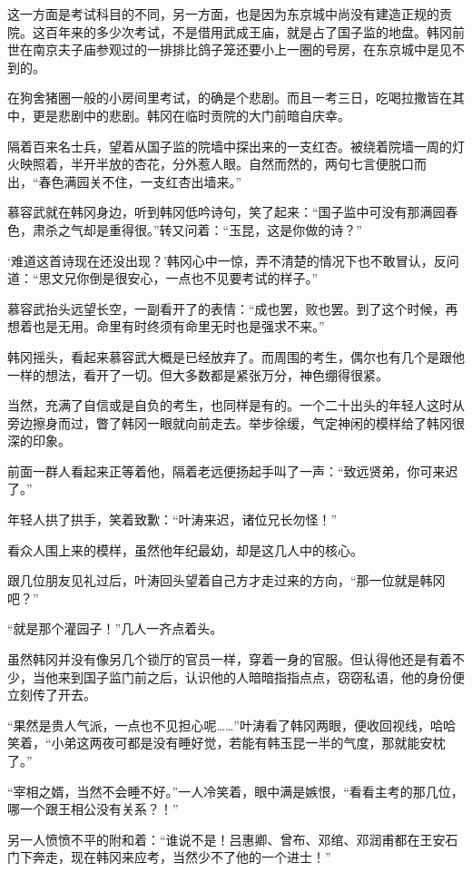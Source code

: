这一方面是考试科目的不同，另一方面，也是因为东京城中尚没有建造正规的贡院。这百年来的多少次考试，不是借用武成王庙，就是占了国子监的地盘。韩冈前世在南京夫子庙参观过的一排排比鸽子笼还要小上一圈的号房，在东京城中是见不到的。

在狗舍猪圈一般的小房间里考试，的确是个悲剧。而且一考三日，吃喝拉撒皆在其中，更是悲剧中的悲剧。韩冈在临时贡院的大门前暗自庆幸。

隔着百来名士兵，望着从国子监的院墙中探出来的一支红杏。被绕着院墙一周的灯火映照着，半开半放的杏花，分外惹人眼。自然而然的，两句七言便脱口而出，“春色满园关不住，一支红杏出墙来。”

慕容武就在韩冈身边，听到韩冈低吟诗句，笑了起来：“国子监中可没有那满园春色，肃杀之气却是重得很。”转又问着：“玉昆，这是你做的诗？”

‘难道这首诗现在还没出现？’韩冈心中一惊，弄不清楚的情况下也不敢冒认，反问道：“思文兄你倒是很安心，一点也不见要考试的样子。”

慕容武抬头远望长空，一副看开了的表情：“成也罢，败也罢。到了这个时候，再想着也是无用。命里有时终须有命里无时也是强求不来。”

韩冈摇头，看起来慕容武大概是已经放弃了。而周围的考生，偶尔也有几个是跟他一样的想法，看开了一切。但大多数都是紧张万分，神色绷得很紧。

当然，充满了自信或是自负的考生，也同样是有的。一个二十出头的年轻人这时从旁边擦身而过，瞥了韩冈一眼就向前走去。举步徐缓，气定神闲的模样给了韩冈很深的印象。

前面一群人看起来正等着他，隔着老远便扬起手叫了一声：“致远贤弟，你可来迟了。”

年轻人拱了拱手，笑着致歉：“叶涛来迟，诸位兄长勿怪！”

看众人围上来的模样，虽然他年纪最幼，却是这几人中的核心。

跟几位朋友见礼过后，叶涛回头望着自己方才走过来的方向，“那一位就是韩冈吧？”

“就是那个灌园子！”几人一齐点着头。

虽然韩冈并没有像另几个锁厅的官员一样，穿着一身的官服。但认得他还是有着不少，当他来到国子监门前之后，认识他的人暗暗指指点点，窃窃私语，他的身份便立刻传了开去。

“果然是贵人气派，一点也不见担心呢……”叶涛看了韩冈两眼，便收回视线，哈哈笑着，“小弟这两夜可都是没有睡好觉，若能有韩玉昆一半的气度，那就能安枕了。”

“宰相之婿，当然不会睡不好。”一人冷笑着，眼中满是嫉恨，“看看主考的那几位，哪一个跟王相公没有关系？！”

另一人愤愤不平的附和着：“谁说不是！吕惠卿、曾布、邓绾、邓润甫都在王安石门下奔走，现在韩冈来应考，当然少不了他的一个进士！”

